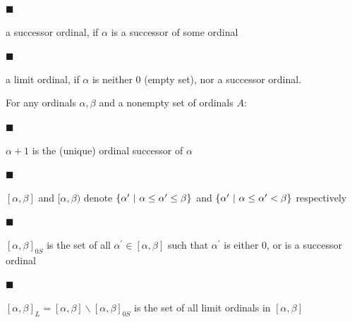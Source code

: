 \documentclass[10pt,a4paper]{amsart}
\begin{document}
 
 
\par\noindent  $\blacksquare$ 
 
a successor ordinal, if $\alpha$ is a successor of some ordinal\par
 
 
 
\par\noindent  $\blacksquare$ 
 
a limit ordinal, if $\alpha$ is neither 0 (empty set), nor a successor ordinal.\par
 
 
  
 
 
For any ordinals $\alpha,\beta$ and a nonempty set of ordinals $A$:\par
  
\par\noindent  $\blacksquare$ 
 
$\alpha+1$ is the (unique) ordinal successor of $\alpha$\par
 
 
 
\par\noindent  $\blacksquare$ 
 
$[\alpha,\beta]$ and $[\alpha,\beta)$ denote $\{\alpha^{\prime}\leavevmode\nobreak\ |\leavevmode\nobreak\ \alpha\leq\alpha^{%
\prime}\leq\beta\}$ and $\{\alpha^{\prime}\leavevmode\nobreak\ |\leavevmode\nobreak\ \alpha\leq\alpha^{%
\prime}<\beta\}$ respectively\par
 
 
 
\par\noindent  $\blacksquare$ 
 
$[\alpha,\beta]_{0S}$ is the set of all $\alpha^{\prime}\in[\alpha,\beta]$ such that $\alpha^{\prime}$ is either 0, or is a successor ordinal\par
 
 
 
\par\noindent  $\blacksquare$ 
 
$[\alpha,\beta]_{L}=[\alpha,\beta]\backslash[\alpha,\beta]_{0S}$ is the set of all limit ordinals in $[\alpha,\beta]$\par
 
\end{document}
